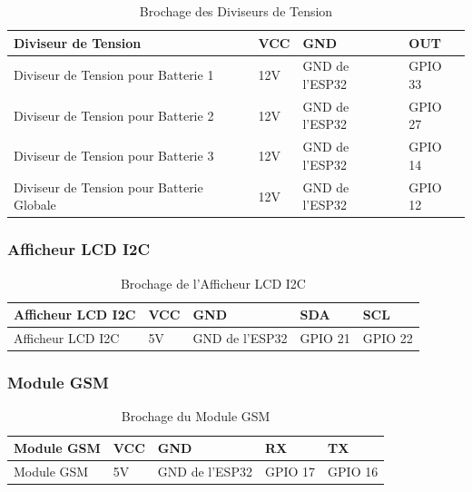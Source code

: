 \begin{table}[H]
	\centering
	\caption{Brochage des Diviseurs de Tension}
	\begin{tabular}{|p{6.5cm}|p{1.5cm}|p{3.5cm}|p{2cm}|}
		\hline
		\rule[0.5cm]{0cm}{0cm} \textbf{Diviseur de Tension} & \textbf{VCC} & \textbf{GND} & \textbf{OUT} \\
		\hline
		\rule[0.5cm]{0cm}{0cm} Diviseur de Tension pour Batterie 1 & 12V & GND de l'ESP32 & GPIO 33 \\
		\hline
		\rule[0.5cm]{0cm}{0cm} Diviseur de Tension pour Batterie 2 & 12V & GND de l'ESP32 & GPIO 27 \\
		\hline
		\rule[0.5cm]{0cm}{0cm} Diviseur de Tension pour Batterie 3 & 12V & GND de l'ESP32 & GPIO 14 \\
		\hline
		\rule[0.5cm]{0cm}{0cm} Diviseur de Tension pour Batterie Globale & 12V & GND de l'ESP32 & GPIO 12 \\
		\hline
	\end{tabular}
\end{table}

\subsubsection*{Afficheur LCD I2C}

\begin{table}[H]
	\centering
	\caption{Brochage de l'Afficheur LCD I2C}
	\begin{tabular}{|p{4.5cm}|p{2cm}|p{3cm}|p{2cm}|p{2cm}|}
		\hline
		\rule[0.5cm]{0cm}{0cm} \textbf{Afficheur LCD I2C} & \textbf{VCC} & \textbf{GND} & \textbf{SDA} & \textbf{SCL} \\
		\hline
		\rule[0.5cm]{0cm}{0cm} Afficheur LCD I2C & 5V & GND de l'ESP32 & GPIO 21 & GPIO 22 \\
		\hline
	\end{tabular}
\end{table}

\subsubsection*{Module GSM}

\begin{table}[H]
	\centering
	\caption{Brochage du Module GSM}
	\begin{tabular}{|p{4.5cm}|p{2cm}|p{3cm}|p{2cm}|p{2cm}|}
		\hline
		\rule[0.5cm]{0cm}{0cm} \textbf{Module GSM} & \textbf{VCC} & \textbf{GND} & \textbf{RX} & \textbf{TX} \\
		\hline
		\rule[0.5cm]{0cm}{0cm} Module GSM & 5V & GND de l'ESP32 & GPIO 17 & GPIO 16 \\
		\hline
	\end{tabular}
\end{table}

